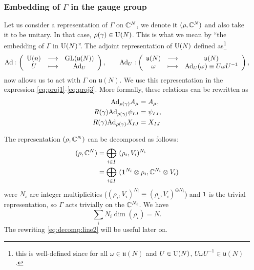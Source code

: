         \subsubsection{Embedding of $\Gamma$ in the gauge group}

            Let us consider a representation of $\Gamma$ on $\mathbb{C}^N$, we denote it $(\rho,\mathbb{C}^N)$ and also take it to be unitary. In that case, $\rho(\gamma)\in\text{U}(N)$. This is what we mean by ``the embedding of $\Gamma$ in $\text{U}(N)$''. The adjoint representation of $\text{U}(N)$ defined as\footnote{this is well-defined since for all $\omega\in\mathfrak{u}(N)$ and $U\in\text{U}(N)$, $U\omega U^{-1}\in\mathfrak{u}(N)$.}
            \begin{equation}
                \text{Ad}:\left(
                \begin{array}{ccc}
                    \text{U}(n) & \longrightarrow & \text{GL}(\mathfrak{u}(N)) \\
                    U & \longmapsto & \text{Ad}_U
                \end{array}
                \right),\qquad
                \text{Ad}_U:\left(
                \begin{array}{ccc}
                    \mathfrak{u}(N) & \longrightarrow & \mathfrak{u}(N) \\
                    \omega & \longmapsto & \text{Ad}_U(\omega)\equiv U\omega U^{-1}
                \end{array}
                \right),
            \end{equation}
            now allows us to act with $\Gamma$ on $\mathfrak{u}(N)$. We use this representation in the expression \eqref{eq:proj1}-\eqref{eq:proj3}. More formally, these relations can be rewritten as
            \begin{align}
                \text{Ad}_{\rho(\gamma)}A_\mu  &= A_\mu,\\
                R(\gamma)\text{Ad}_{\rho(\gamma)}\psi_{IJ}  &= \psi_{IJ},\\
                R(\gamma)\text{Ad}_{\rho(\gamma)}X_{IJ} &= X_{IJ}
            \end{align}

            The representation $(\rho,\mathbb{C}^N)$ can be decomposed as follows:
            \begin{align}
                (\rho,\mathbb{C}^N) &= \bigoplus_{i\in I}~(\rho_i,V_i)^{N_i} \label{eq:decomp:line1} \\
                &= \bigoplus_{i\in I}~(\boldsymbol{1}^{N_i}\otimes\rho_i,\mathbb{C}^{N_i}\otimes V_i) \label{eq:decomp:line2}
            \end{align}
            were $N_i$ are integer multiplicities ($(\rho_i,V_i)^{N_i}\equiv(\rho_i,V_i)^{\oplus N_i}$) and $\boldsymbol{1}$ is the trivial representation, so $\Gamma$ acts trivially on the $\mathbb{C}^{N_i}$. We have
            \begin{equation}
                \sum_iN_i\dim(\rho_i)=N.
            \end{equation}
            The rewriting \eqref{eq:decomp:line2} will be useful later on.

